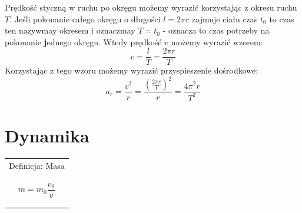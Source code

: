 \documentclass[a4paper]{article}
\newenvironment{definition}[1][title]
    {
        \begin{center}
        \begin{tabular}{|p{1\textwidth}|}
        \hline
            Definicja: #1\\[2ex]
        \begin{em}
        \Large
    }
    { 
        \end{em}
        \\\hline
        \end{tabular} 
        \end{center}
    }
\begin{document}
    Prędkość styczną w ruchu po okręgu możemy wyrazić korzystając z okresu ruchu $T$.
    Jeśli pokonanie całego okręgu o długości $l = 2\pi r$ zajmuje ciału czas $t_0$ to czas
    ten nazywmay okresem i oznaczmay $T = t_0$ - oznacza to czas potrzeby na pokonanie \textbf 
    jednego okręgu.
    Wtedy prędkość $v$ możemy wyrazić wzorem:
    \[v = \frac{l}{T} = \frac{2\pi r}{T} \]
    Korzystając z tego wzoru możemy wyrazić przyspieszenie dośrodkowe:
    \[a_r = \frac{v^2}{r} = \frac{\left (\frac{2\pi r}{T} \right )^2}{r} = \frac{4\pi^2 r}{T^2}\]
    
    \pagebreak
    \section{\huge Dynamika}
    \begin{definition}[Masa]
        \[m = m_0\frac{v_0}{v}\]
    \end{definition}    
\end{document}
